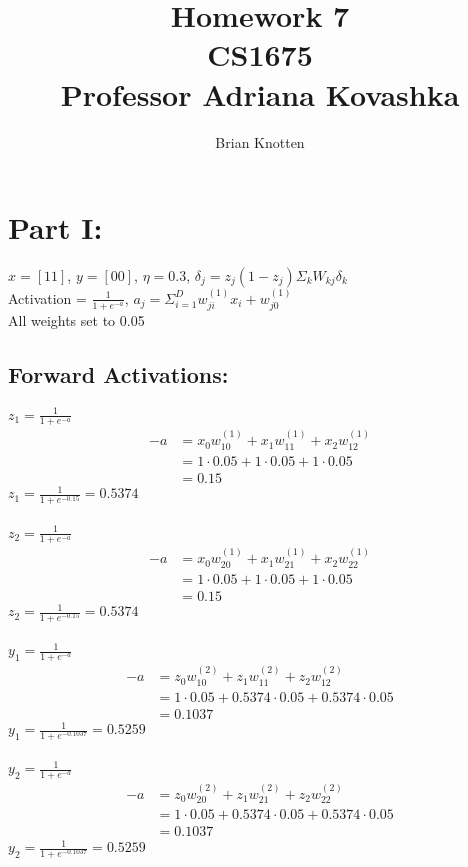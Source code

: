 \documentclass[letterpaper,notitlepage,twoside, fleqn]{article}
\begin{document}
\title{%
  Homework 7 \\
  \large CS1675 \\
  \large Professor Adriana Kovashka}
\author{Brian Knotten}
\maketitle

\section*{Part I:}
$x = [1 1]$, $y = [0 0]$, $\eta = 0.3$, $\delta_j = z_j (1 - z_j) \Sigma_k W_{kj} \delta_k$ \\
Activation = $\frac{1}{1+e^{-a}}$, $a_j = \Sigma_{i=1}^D w^{(1)}_{ji} x_i + w_{j0}^{(1)}$\\
All weights set to 0.05 \\
\subsection*{Forward Activations:}
$z_1 = \frac{1}{1+e^{-a}}$
\begin{align*}
-a & = x_0 w^{(1)}_{10} + x_1 w^{(1)}_{11} + x_2 w^{(1)}_{12} \\
 & = 1 \cdot 0.05 + 1 \cdot 0.05 + 1 \cdot 0.05 \\
 & = 0.15
 \end{align*}
$z_1 = \frac{1}{1+e^{-0.15}} = 0.5374$ \\\\
$z_2 = \frac{1}{1+e^{-a}}$
\begin{align*}
-a & = x_0 w^{(1)}_{20} + x_1 w^{(1)}_{21} + x_2 w^{(1)}_{22} \\
 & = 1 \cdot 0.05 + 1 \cdot 0.05 + 1 \cdot 0.05 \\
 & = 0.15
 \end{align*}
 $z_2 = \frac{1}{1+e^{-0.15}} = 0.5374$ \\\\
 $y_1 = \frac{1}{1+e^{-a}}$
 \begin{align*}
-a & = z_0 w^{(2)}_{10} + z_1 w^{(2)}_{11} + z_2 w^{(2)}_{12} \\
 & = 1 \cdot 0.05 + 0.5374 \cdot 0.05 + 0.5374 \cdot 0.05 \\
 & = 0.1037
 \end{align*}
  $y_1 = \frac{1}{1+e^{-0.1037}} = 0.5259$ \\\\
  $y_2 = \frac{1}{1+e^{-a}}$
  \begin{align*}
-a & = z_0 w^{(2)}_{20} + z_1 w^{(2)}_{21} + z_2 w^{(2)}_{22} \\
 & = 1 \cdot 0.05 + 0.5374 \cdot 0.05 + 0.5374 \cdot 0.05 \\
 & = 0.1037
 \end{align*}
   $y_2 = \frac{1}{1+e^{-0.1037}} = 0.5259$ 
\end{document}
